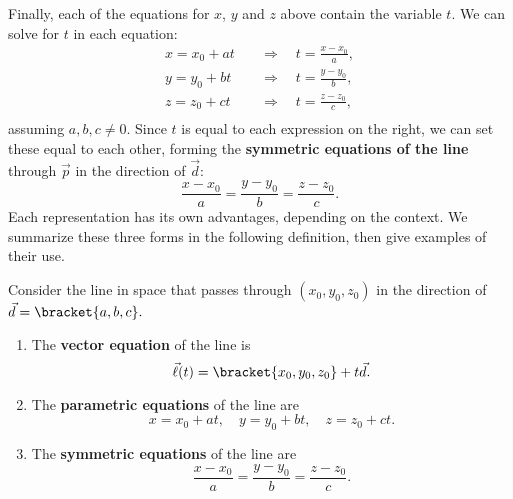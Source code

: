 Finally, each of the equations for $x$, $y$ and $z$ above contain the variable $t$. We can solve for $t$ in each equation:
\begin{align*}
x = x_0+at \quad&\Rightarrow\quad t = \frac{x-x_0}{a},\\
y = y_0+bt \quad&\Rightarrow\quad t = \frac{y-y_0}{b},\\
z = z_0+ct \quad&\Rightarrow\quad t = \frac{z-z_0}{c},\\
\end{align*}
assuming $a,b,c\neq 0$.
Since $t$ is equal to each expression on the right, we can set these equal to each other, forming the \textbf{symmetric equations of the line} through $\vec p$ in the direction of $\vec d$:
\[\frac{x-x_0}{a} = \frac{y-y_0}{b}=\frac{z-z_0}{c}.\]
Each representation has its own advantages, depending on the context. We summarize these three forms in the following definition, then give examples of their use.

\begin{definition}\label{def:lines}%
Consider the line in space that passes through $(x_0,y_0,z_0)$ in the direction of $\vec d =\bracket{a,b,c}.$
\begin{enumerate}
	\item The \textbf{vector equation} of the line is
	\[\vec \ell(t) = \bracket{x_0,y_0,z_0}+t\vec d.\]
	\item	The \textbf{parametric equations} of the line are
	\[x = x_0+at, \quad y=y_0+bt, \quad z = z_0+ct .\]
	\item	The \textbf{symmetric equations} of the line are
	\[\frac{x-x_0}{a} = \frac{y-y_0}{b}=\frac{z-z_0}{c}.\]
\end{enumerate}
\end{definition}


